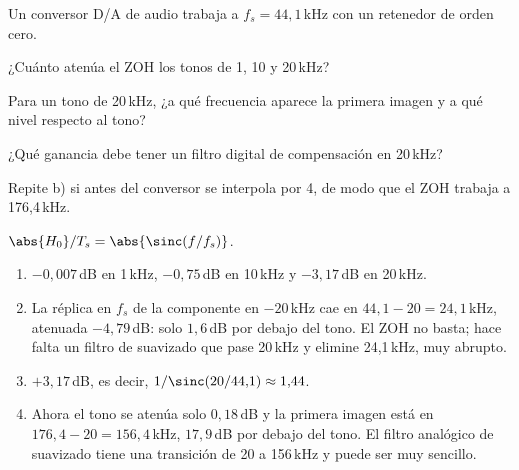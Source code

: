 \documentclass[11pt,a4paper]{scrartcl}
\begin{document}
\begin{ejercicio}
  Un conversor D/A de audio trabaja a $f_s=44{,}1$\,kHz con un retenedor de orden cero.
  \begin{incisos}[1]
    \item ¿Cuánto atenúa el ZOH los tonos de 1, 10 y 20\,kHz?
    \item Para un tono de 20\,kHz, ¿a qué frecuencia aparece la primera imagen y a qué nivel respecto al tono?
    \item ¿Qué ganancia debe tener un filtro digital de compensación en 20\,kHz?
    \item Repite b) si antes del conversor se interpola por 4, de modo que el ZOH trabaja a 176,4\,kHz.
  \end{incisos}
\end{ejercicio}
\begin{solucion}
  $\abs{H_0}/T_s=\abs{\sinc(f/f_s)}$.
  \begin{enumerate}[label=\alph*)]
    \item $-0{,}007$\,dB en 1\,kHz, $-0{,}75$\,dB en 10\,kHz y $-3{,}17$\,dB en 20\,kHz.
    \item La réplica en $f_s$ de la componente en $-20$\,kHz cae en $44{,}1-20=24{,}1$\,kHz, atenuada $-4{,}79$\,dB: solo $1{,}6$\,dB por debajo del tono. El ZOH no basta; hace falta un filtro de suavizado que pase 20\,kHz y elimine 24,1\,kHz, muy abrupto.
    \item $+3{,}17$\,dB, es decir, $1/\sinc(20/44{,}1)\approx1{,}44$.
    \item Ahora el tono se atenúa solo $0{,}18$\,dB y la primera imagen está en $176{,}4-20=156{,}4$\,kHz, $17{,}9$\,dB por debajo del tono. El filtro analógico de suavizado tiene una transición de 20 a 156\,kHz y puede ser muy sencillo.
  \end{enumerate}
\end{solucion}
\end{document}
